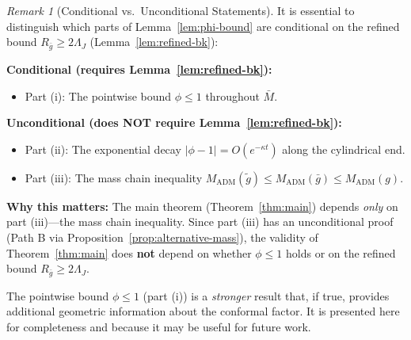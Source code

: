\documentclass[12pt]{article}
\theoremstyle{plain}
\theoremstyle{definition}
\theoremstyle{remark}
\newtheorem{remark}[theorem]{Remark}
\newcommand{\ADM}{\mathrm{ADM}}
\newcommand{\tg}{\tilde{g}}
\newcommand{\bg}{\bar{g}}
\newcommand{\bM}{\bar{M}}
\begin{document}
\begin{remark}[Conditional vs.\ Unconditional Statements]\label{rem:conditional-phi-bound}
It is essential to distinguish which parts of Lemma~\ref{lem:phi-bound} are conditional on the refined bound $R_{\bg} \geq 2\Lambda_J$ (Lemma~\ref{lem:refined-bk}):

\textbf{Conditional (requires Lemma~\ref{lem:refined-bk}):}
\begin{itemize}
\item Part (i): The pointwise bound $\phi \leq 1$ throughout $\bM$.
\end{itemize}

\textbf{Unconditional (does NOT require Lemma~\ref{lem:refined-bk}):}
\begin{itemize}
\item Part (ii): The exponential decay $|\phi - 1| = O(e^{-\kappa t})$ along the cylindrical end.
\item Part (iii): The mass chain inequality $M_{\ADM}(\tg) \leq M_{\ADM}(\bg) \leq M_{\ADM}(g)$.
\end{itemize}

\textbf{Why this matters:} The main theorem (Theorem~\ref{thm:main}) depends \emph{only} on part (iii)---the mass chain inequality. Since part (iii) has an unconditional proof (Path B via Proposition~\ref{prop:alternative-mass}), the validity of Theorem~\ref{thm:main} does \textbf{not} depend on whether $\phi \leq 1$ holds or on the refined bound $R_{\bg} \geq 2\Lambda_J$.

The pointwise bound $\phi \leq 1$ (part (i)) is a \emph{stronger} result that, if true, provides additional geometric information about the conformal factor. It is presented here for completeness and because it may be useful for future work.
\end{remark}
\end{document}
